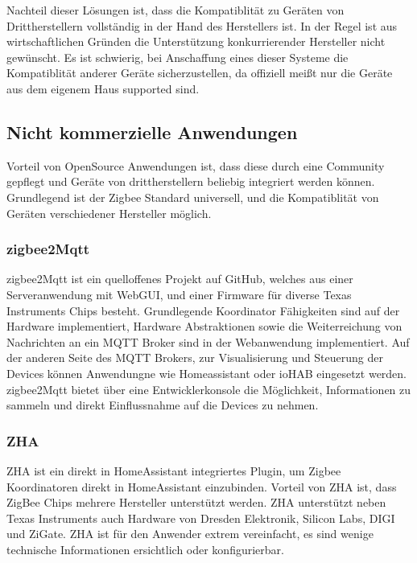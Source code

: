 Nachteil dieser Lösungen ist, dass die Kompatiblität zu Geräten von Drittherstellern vollständig in der Hand des Herstellers ist. In der Regel ist aus
wirtschaftlichen Gründen die Unterstützung konkurrierender Hersteller nicht gewünscht. Es ist schwierig, bei Anschaffung eines dieser Systeme die Kompatiblität
anderer Geräte sicherzustellen, da offiziell meißt nur die Geräte aus dem eigenem Haus supported sind.

\subsection{Nicht kommerzielle Anwendungen}

Vorteil von OpenSource Anwendungen ist, dass diese durch eine Community gepflegt und Geräte von drittherstellern beliebig integriert werden können.
Grundlegend ist der Zigbee Standard universell, und die Kompatiblität von Geräten verschiedener Hersteller möglich.

\subsubsection{zigbee2Mqtt}

zigbee2Mqtt ist ein quelloffenes Projekt auf GitHub, welches aus einer Serveranwendung mit WebGUI, und einer Firmware für diverse Texas Instruments Chips besteht.
Grundlegende Koordinator Fähigkeiten sind auf der Hardware implementiert, Hardware Abstraktionen sowie die Weiterreichung von Nachrichten an ein MQTT Broker sind
in der Webanwendung implementiert. Auf der anderen Seite des MQTT Brokers, zur Visualisierung und Steuerung der Devices können Anwendungne wie Homeassistant oder ioHAB eingesetzt
werden. zigbee2Mqtt bietet über eine Entwicklerkonsole die Möglichkeit, Informationen zu sammeln und direkt Einflussnahme auf die Devices zu nehmen.

\subsubsection{ZHA}
ZHA ist ein direkt in HomeAssistant integriertes Plugin, um Zigbee Koordinatoren direkt in HomeAssistant einzubinden. Vorteil
von ZHA ist, dass ZigBee Chips mehrere Hersteller unterstützt werden. ZHA unterstützt neben Texas Instruments auch Hardware von Dresden Elektronik,
Silicon Labs, DIGI und ZiGate. ZHA ist für den Anwender extrem vereinfacht, es sind wenige technische Informationen ersichtlich oder konfigurierbar. 







